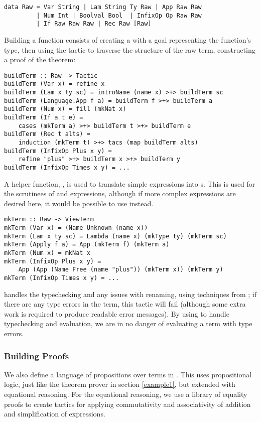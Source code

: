 \begin{verbatim}
data Raw = Var String | Lam String Ty Raw | App Raw Raw
         | Num Int | Boolval Bool  | InfixOp Op Raw Raw
         | If Raw Raw Raw | Rec Raw [Raw]
\end{verbatim}

Building a \Funl{} function consists of creating a  
with a goal representing the function's type, then using the
 tactic to traverse the
structure of the raw term, constructing a proof of the
theorem:

\begin{verbatim}
buildTerm :: Raw -> Tactic
buildTerm (Var x) = refine x
buildTerm (Lam x ty sc) = introName (name x) >+> buildTerm sc
buildTerm (Language.App f a) = buildTerm f >+> buildTerm a
buildTerm (Num x) = fill (mkNat x)
buildTerm (If a t e) = 
    cases (mkTerm a) >+> buildTerm t >+> buildTerm e
buildTerm (Rec t alts) =
    induction (mkTerm t) >+> tacs (map buildTerm alts)
buildTerm (InfixOp Plus x y) = 
    refine "plus" >+> buildTerm x >+> buildTerm y
buildTerm (InfixOp Times x y) = ...
\end{verbatim}

A helper function, , is used to translate simple
expressions into s. This is used for the scrutinees of
 and  expressions, although if more complex
expressions are desired here, it would be possible to use
 instead.

\begin{verbatim}
mkTerm :: Raw -> ViewTerm
mkTerm (Var x) = (Name Unknown (name x))
mkTerm (Lam x ty sc) = Lambda (name x) (mkType ty) (mkTerm sc)
mkTerm (Apply f a) = App (mkTerm f) (mkTerm a)
mkTerm (Num x) = mkNat x
mkTerm (InfixOp Plus x y) = 
    App (App (Name Free (name "plus")) (mkTerm x)) (mkTerm y)
mkTerm (InfixOp Times x y) = ...
\end{verbatim}

\Ivor{} handles
the typechecking and any issues with renaming, using techniques from
\cite{not-a-number}; if there are any type errors in the 
term, this tactic will fail (although some extra work is required to
produce readable error messages). By using \Ivor{} to handle
typechecking and evaluation, we are in no danger of evaluating a term
with type errors.


\subsubsection{Building Proofs}
We also define a language of propositions over terms in \Funl{}.
This uses propositional logic, just like the theorem prover in
section \ref{example1}, but extended with equational reasoning. For
the equational reasoning, we use a library of equality proofs to
create tactics for applying commutativity and associativity of
addition and simplification of expressions.

